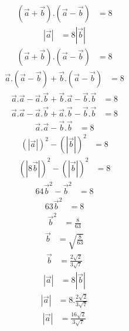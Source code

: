 \documentclass[10pt]{article}
\providecommand{\abs}[1]{\left\vert#1\right\vert}
\begin{document}
\begin{enumerate}
\begin{align}
(\overrightarrow{a}+\overrightarrow{b}).(\overrightarrow{a}-\overrightarrow{b})&=8
\end{align}
\begin{align}
\abs{\overrightarrow{a}}&=8\abs{\overrightarrow{b}}
\end{align}
\begin{align}
(\overrightarrow{a}+\overrightarrow{b}).(\overrightarrow{a}-\overrightarrow{b})&=8
\end{align}
\begin{align}
\overrightarrow{a}.(\overrightarrow{a}-\overrightarrow{b})+\overrightarrow{b}.(\overrightarrow{a}-\overrightarrow{b})&=8
\end{align}
\begin{align}
\overrightarrow{a}.\overrightarrow{a}-\overrightarrow{a}.\overrightarrow{b}+\overrightarrow{b}.\overrightarrow{a}-\overrightarrow{b}.\overrightarrow{b}&=8
\end{align}
\begin{align}
\overrightarrow{a}.\overrightarrow{a}-\overrightarrow{a}.\overrightarrow{b}+\overrightarrow{a}.\overrightarrow{b}-\overrightarrow{b}.\overrightarrow{b}&=8
\end{align}
\begin{align}
\overrightarrow{a}.\overrightarrow{a}-\overrightarrow{b}.\overrightarrow{b}&=8
\end{align}
\begin{align}
(\abs{\overrightarrow{a}})^2-(\abs{\overrightarrow{b}})^2&=8
\end{align}
\begin{align}
(\abs{8\overrightarrow{b}})^2-(\abs{\overrightarrow{b}})^2&=8
\end{align}
\begin{align}
64{\overrightarrow{b}}^2-\overrightarrow{b}^2&=8
\end{align}
\begin{align}
63{\overrightarrow{b}}^2&=8
\end{align}
\begin{align}
\overrightarrow{b}^2&=\frac{8}{63}
\end{align}
\begin{align}
\overrightarrow{b}&=\sqrt{\frac{8}{63}}
\end{align}
\begin{align}
\overrightarrow{b}&=\frac{2\sqrt{2}}{3\sqrt{7}}
\end{align}
\begin{align}
\abs{\overrightarrow{a}}&=8\abs{\overrightarrow{b}}
\end{align}
\begin{align}
\abs{\overrightarrow{a}}&=8.\frac{2\sqrt{2}}{3\sqrt{7}}
\end{align}
\begin{align}
\abs{\overrightarrow{a}}&=\frac{16\sqrt{2}}{3\sqrt{7}}
\end{align}
\end{enumerate}
\end{document}
